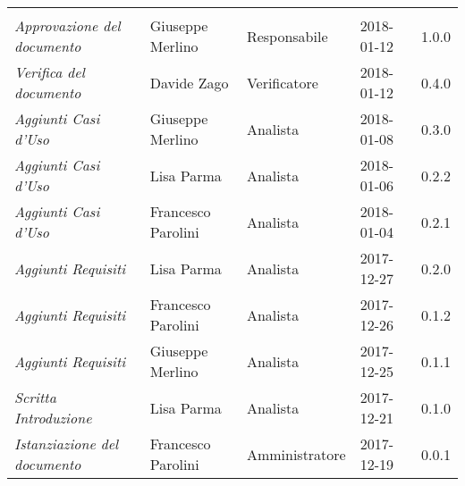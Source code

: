 \newpage 
\section*{}
\begin{table}[H]
	\centering
	\begin{tabular}{p{4cm}|C{3cm}|C{3cm}|R{2.5cm}|R{2cm}}
		
		 & & & & \\
		
		
		\emph{Approvazione del documento}& Giuseppe Merlino & Responsabile & 2018-01-12 & 1.0.0 \\
		\hline
		
		\emph{Verifica del documento}& Davide Zago & Verificatore & 2018-01-12 & 0.4.0 \\
		\hline
		
		\emph{Aggiunti Casi d'Uso}& Giuseppe Merlino & Analista & 2018-01-08 & 0.3.0 \\
		\hline
		
		\emph{Aggiunti Casi d'Uso}& Lisa Parma & Analista & 2018-01-06 & 0.2.2 \\
		\hline
		
		\emph{Aggiunti Casi d'Uso}& Francesco Parolini & Analista & 2018-01-04 & 0.2.1 \\
		\hline
		
		\emph{Aggiunti Requisiti}& Lisa Parma & Analista & 2017-12-27 & 0.2.0 \\
		\hline
		
		\emph{Aggiunti Requisiti}& Francesco Parolini & Analista & 2017-12-26 & 0.1.2 \\
		\hline
		
		\emph{Aggiunti Requisiti}& Giuseppe Merlino & Analista & 2017-12-25 & 0.1.1 \\
		\hline
		
		\emph{Scritta Introduzione}& Lisa Parma & Analista & 2017-12-21 & 0.1.0 \\
		\hline
		
		\emph{Istanziazione del documento}& Francesco Parolini & Amministratore & 2017-12-19 & 0.0.1 \\
		\hline
		
	\end{tabular}
	
\end{table}


\clearpage